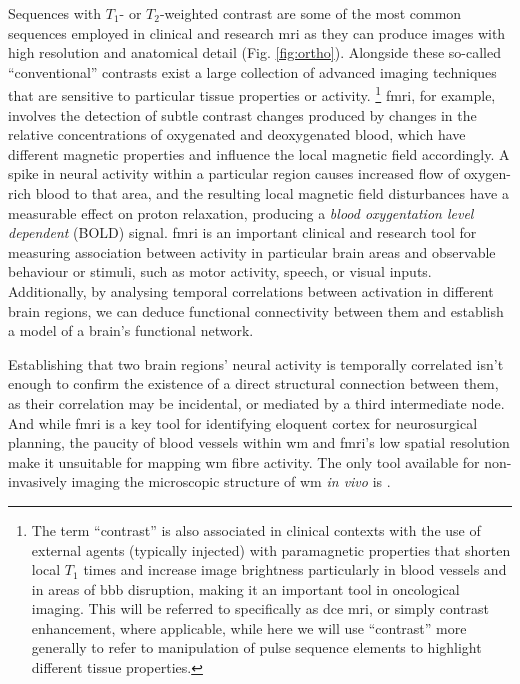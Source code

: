 Sequences with $T_1$- or $T_2$-weighted contrast are some of the most common sequences employed in clinical and research \gls{mri} as they can produce images with high resolution and anatomical detail (Fig. \ref{fig:ortho}).
Alongside these so-called ``conventional'' contrasts exist a large collection of advanced imaging techniques that are sensitive to particular tissue properties or activity.%
\footnote[2]{The term ``contrast'' is also associated in clinical contexts with the use of external agents (typically injected) with paramagnetic properties that shorten local $T_1$ times and increase image brightness particularly in blood vessels and in areas of \gls{bbb} disruption, making it an important tool in oncological imaging. This will be referred to specifically as \gls{dce} \gls{mri}, or simply contrast enhancement, where applicable, while here we will use ``contrast'' more generally to refer to manipulation of pulse sequence elements to highlight different tissue properties.}
\gls{fmri}, for example, involves the detection of subtle contrast changes produced by changes in the relative concentrations of oxygenated and deoxygenated blood, which have different magnetic properties and influence the local magnetic field accordingly.
A spike in neural activity within a particular region causes increased flow of oxygen-rich blood to that area, and the resulting local magnetic field disturbances have a measurable effect on proton relaxation, producing a \textit{blood oxygentation level dependent} (BOLD) signal.
\Gls{fmri} is an important clinical and research tool for measuring association between activity in particular brain areas and observable behaviour or stimuli, such as motor activity, speech, or visual inputs.
Additionally, by analysing temporal correlations between activation in different brain regions, we can deduce functional connectivity between them and establish a model of a brain's functional network.

Establishing that two brain regions' neural activity is temporally correlated isn't enough to confirm the existence of a direct structural connection between them, as their correlation may be incidental, or mediated by a third intermediate node.
And while \gls{fmri} is a key tool for identifying eloquent cortex for neurosurgical planning, the paucity of blood vessels within \gls{wm} and \gls{fmri}'s low spatial resolution make it unsuitable for mapping \gls{wm} fibre activity.
The only tool available for non-invasively imaging the microscopic structure of \gls{wm} \textit{in vivo} is .


